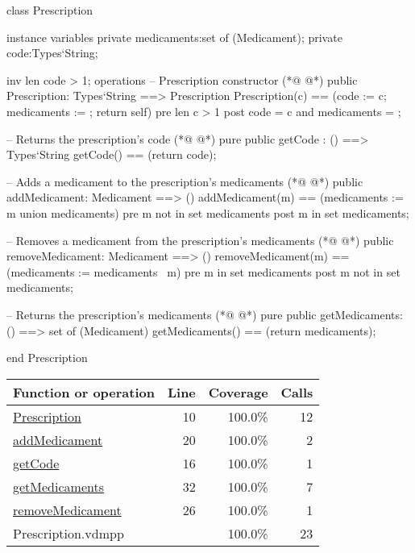 \begin{vdmpp}[breaklines=true]
class Prescription

instance variables
  private medicaments:set of (Medicament);
  private code:Types`String;
  
  inv len code > 1;
operations
 -- Prescription constructor
(*@
\label{Prescription:10}
@*)
 public Prescription: Types`String ==> Prescription
  Prescription(c) == (code := c; medicaments := {}; return self)
 pre len c > 1
 post code = c and medicaments = {};
 
 -- Returns the prescription's code
(*@
\label{getCode:16}
@*)
 pure public getCode : () ==> Types`String
  getCode() == (return code);
 
 -- Adds a medicament to the prescription's medicaments
(*@
\label{addMedicament:20}
@*)
 public addMedicament: Medicament ==> ()
  addMedicament(m) == (medicaments := {m} union medicaments)
 pre m not in set medicaments
 post m in set medicaments;
 
 -- Removes a medicament from the prescription's medicaments
(*@
\label{removeMedicament:26}
@*)
 public removeMedicament: Medicament ==> ()
  removeMedicament(m) == (medicaments := medicaments \ {m})
 pre m in set medicaments
 post m not in set medicaments;
 
 -- Returns the prescription's medicaments
(*@
\label{getMedicaments:32}
@*)
 pure public getMedicaments: () ==> set of (Medicament)
  getMedicaments() == (return medicaments);

end Prescription
\end{vdmpp}
\bigskip
\begin{longtable}{|l|r|r|r|}
\hline
Function or operation & Line & Coverage & Calls \\
\hline
\hline
\hyperref[Prescription:10]{Prescription} & 10&100.0\% & 12 \\
\hline
\hyperref[addMedicament:20]{addMedicament} & 20&100.0\% & 2 \\
\hline
\hyperref[getCode:16]{getCode} & 16&100.0\% & 1 \\
\hline
\hyperref[getMedicaments:32]{getMedicaments} & 32&100.0\% & 7 \\
\hline
\hyperref[removeMedicament:26]{removeMedicament} & 26&100.0\% & 1 \\
\hline
\hline
Prescription.vdmpp & & 100.0\% & 23 \\
\hline
\end{longtable}

